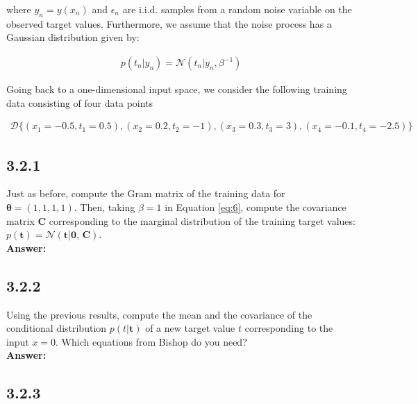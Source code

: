 \documentclass[a4paper]{article}
\begin{document}
where $y_n = y(x_n)$ and $\epsilon_n$ are i.i.d. samples from a random noise variable on the observed target values. Furthermore, we assume that the noise process has a Gaussian distribution given by:

\begin{eqnarray} \label{eq:6}
p(t_n | y_n) = \mathcal{N}(t_n | y_n, \beta^{-1})
\end{eqnarray}

Going back to a one-dimensional input space, we consider the following training data consisting of four data points 

\begin{align*}
\mathcal{D} \{ (x_1 = -0.5, t_1 = 0.5), (x_2 = 0.2, t_2 = -1), (x_3 = 0.3, t_3 = 3),(x_4 = -0.1, t_4 = -2.5) \}
\end{align*}


\subsection*{3.2.1}

Just as before, compute the Gram matrix of the training data for $\boldsymbol{\theta} = (1,1,1,1)$. Then, taking $\beta = 1$ in Equation \ref{eq:6}, compute the covariance matrix \textbf{C} corresponding to the marginal distribution of the training target values: $p(\textbf{t}) = \mathcal{N}(\textbf{t} | \textbf{0, C})$.\\

\textbf{Answer:}\\






\subsection*{3.2.2}

Using the previous results, compute the mean and the covariance of the conditional distribution $p(t | \textbf{t})$ of a new target value $t$ corresponding to the input $x = 0$. Which equations from Bishop do you need?\\

\textbf{Answer:}\\







\subsection*{3.2.3}
\end{document}

